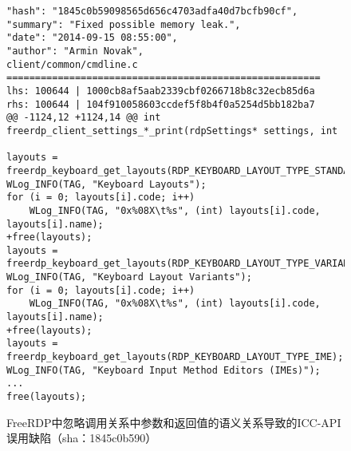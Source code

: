 \begin{figure}[b]
	\centering
\begin{lstlisting}
"hash": "1845c0b59098565d656c4703adfa40d7bcfb90cf",
"summary": "Fixed possible memory leak.",
"date": "2014-09-15 08:55:00",
"author": "Armin Novak",
client/common/cmdline.c
=======================================================
lhs: 100644 | 1000cb8af5aab2339cbf0266718b8c32ecb85d6a
rhs: 100644 | 104f910058603ccdef5f8b4f0a5254d5bb182ba7
@@ -1124,12 +1124,14 @@ int freerdp_client_settings_*_print(rdpSettings* settings, int

layouts = freerdp_keyboard_get_layouts(RDP_KEYBOARD_LAYOUT_TYPE_STANDARD);
WLog_INFO(TAG, "Keyboard Layouts");
for (i = 0; layouts[i].code; i++)
	WLog_INFO(TAG, "0x%08X\t%s", (int) layouts[i].code, layouts[i].name);
+free(layouts);
layouts = freerdp_keyboard_get_layouts(RDP_KEYBOARD_LAYOUT_TYPE_VARIANT);
WLog_INFO(TAG, "Keyboard Layout Variants");
for (i = 0; layouts[i].code; i++)
	WLog_INFO(TAG, "0x%08X\t%s", (int) layouts[i].code, layouts[i].name);
+free(layouts);
layouts = freerdp_keyboard_get_layouts(RDP_KEYBOARD_LAYOUT_TYPE_IME);
WLog_INFO(TAG, "Keyboard Input Method Editors (IMEs)");
...
free(layouts);
\end{lstlisting}
	\caption{
	FreeRDP中忽略调用关系中参数和返回值的语义关系导致的ICC-API误用缺陷（sha：1845c0b590）
	}
	\label{fig:2-3-icc-2}
\end{figure}